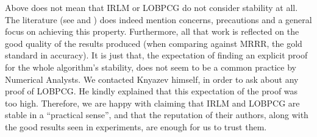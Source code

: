 Above does not mean that \gls{IRLM} or \gls{LOBPCG} do not consider
stability at all. The literature (see \cite{arpack} and
\cite{knyazev01}) does indeed mention concerns, precautions and 
a general focus on achieving this property. Furthermore, all that
work is reflected on the good quality of the results produced (when
comparing against \gls{MRRR}, the gold standard in accuracy). It is just
that, the expectation of finding an explicit proof for the whole
algorithm's stability, does not seem to be a
common practice by Numerical Analysts. We contacted Knyazev
himself, in order to ask about any proof of \gls{LOBPCG}. He
kindly explained that this expectation of the proof was too
high. Therefore, we are happy with claiming that
\gls{IRLM} and \gls{LOBPCG} are stable in a ``practical sense'',
and that the reputation of their authors, along with the good results
seen in experiments, are enough for us to trust them.

